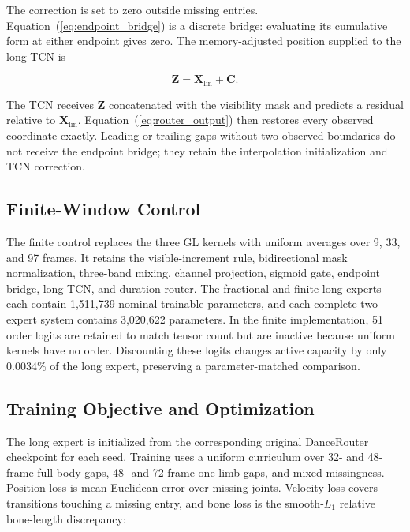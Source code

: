 \documentclass[fractalfract,article,submit,moreauthors,pdftex]{Definitions/mdpi}
\begin{document}
The correction is set to zero outside missing entries. Equation~(\ref{eq:endpoint_bridge}) is a discrete bridge: evaluating its cumulative form at either endpoint gives zero. The memory-adjusted position supplied to the long TCN is

\begin{linenomath}
\begin{equation}
\mathbf{Z}=\mathbf{X}_{\mathrm{lin}}+\mathbf{C}.
\label{eq:adjusted_signal}
\end{equation}
\end{linenomath}

The TCN receives $\mathbf{Z}$ concatenated with the visibility mask and predicts a residual relative to $\mathbf{X}_{\mathrm{lin}}$. Equation~(\ref{eq:router_output}) then restores every observed coordinate exactly. Leading or trailing gaps without two observed boundaries do not receive the endpoint bridge; they retain the interpolation initialization and TCN correction.

\subsection{Finite-Window Control}

The finite control replaces the three GL kernels with uniform averages over 9, 33, and 97 frames. It retains the visible-increment rule, bidirectional mask normalization, three-band mixing, channel projection, sigmoid gate, endpoint bridge, long TCN, and duration router. The fractional and finite long experts each contain 1,511,739 nominal trainable parameters, and each complete two-expert system contains 3,020,622 parameters. In the finite implementation, 51 order logits are retained to match tensor count but are inactive because uniform kernels have no order. Discounting these logits changes active capacity by only 0.0034\% of the long expert, preserving a parameter-matched comparison.

\subsection{Training Objective and Optimization}

The long expert is initialized from the corresponding original DanceRouter checkpoint for each seed. Training uses a uniform curriculum over 32- and 48-frame full-body gaps, 48- and 72-frame one-limb gaps, and mixed missingness. Position loss is mean Euclidean error over missing joints. Velocity loss covers transitions touching a missing entry, and bone loss is the smooth-$L_1$ relative bone-length discrepancy:
\end{document}
